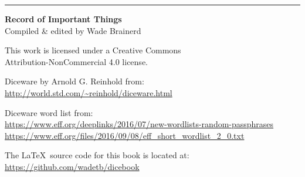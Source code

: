 

\vfill
\rule{\textwidth}{.5pt}

\changepage{1em}{}{}{}{}{}{}{}{}

\textbf{Record of Important Things} \ccbync \\
\scriptsize
Compiled \& edited by Wade Brainerd

This work is licensed under a Creative Commons \\ Attribution-NonCommercial 4.0 license.


Diceware by Arnold G. Reinhold from: \\
\url{http://world.std.com/~reinhold/diceware.html}

Diceware word list from: \\ \url{https://www.eff.org/deeplinks/2016/07/new-wordlists-random-passphrases} \\
\url{https://www.eff.org/files/2016/09/08/eff_short_wordlist_2_0.txt}

The \LaTeX\ source code for this book is located at: \\ \url{https://github.com/wadetb/dicebook}

